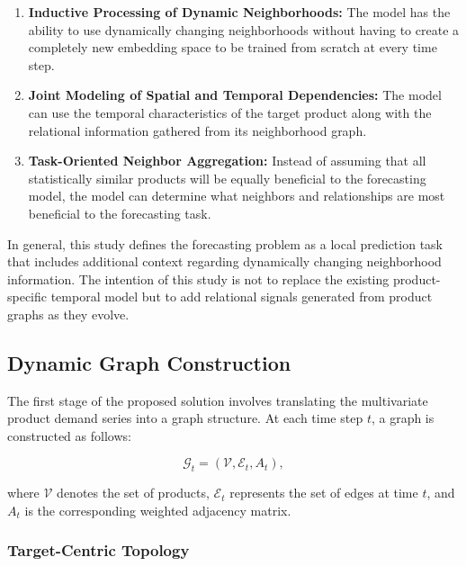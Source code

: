\begin{enumerate}
\item \textbf{Inductive Processing of Dynamic Neighborhoods:} The model has the ability to use dynamically changing neighborhoods without having to create a completely new embedding space to be trained from scratch at every time step.

\item \textbf{Joint Modeling of Spatial and Temporal Dependencies:} The model can use the temporal characteristics of the target product along with the relational information gathered from its neighborhood graph.

\item \textbf{Task-Oriented Neighbor Aggregation:} Instead of assuming that all statistically similar products will be equally beneficial to the forecasting model, the model can determine what neighbors and relationships are most beneficial to the forecasting task.
\end{enumerate}


In general, this study defines the forecasting problem as a local prediction task that includes additional context regarding dynamically changing neighborhood information. The intention of this study is not to replace the existing product-specific temporal model but to add relational signals generated from product graphs as they evolve.

\subsection{Dynamic Graph Construction}
\label{subsec:dynamic_graph_construction}

The first stage of the proposed solution involves translating the multivariate product demand series into a graph structure. At each time step \(t\), a graph is constructed as follows:

\begin{equation}
    \mathcal{G}_t = \left(\mathcal{V}, \mathcal{E}_t, A_t\right),
    \label{eq:dynamic_graph_with_adjacency}
\end{equation}

where \(\mathcal{V}\) denotes the set of products, \(\mathcal{E}_t\) represents the set of edges at time \(t\), and \(A_t\) is the corresponding weighted adjacency matrix.



\subsubsection{Target-Centric Topology}

